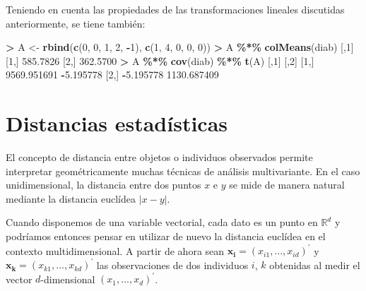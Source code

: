 \documentclass[
  a4paper,
  oneside]{scrbook}
\newenvironment{Shaded}{\begin{snugshade}}{\end{snugshade}}
\newcommand{\DecValTok}[1]{\textcolor[rgb]{0.00,0.00,0.81}{#1}}
\newcommand{\FloatTok}[1]{\textcolor[rgb]{0.00,0.00,0.81}{#1}}
\newcommand{\FunctionTok}[1]{\textcolor[rgb]{0.13,0.29,0.53}{\textbf{#1}}}
\newcommand{\NormalTok}[1]{#1}
\newcommand{\OtherTok}[1]{\textcolor[rgb]{0.56,0.35,0.01}{#1}}
\newcommand{\SpecialCharTok}[1]{\textcolor[rgb]{0.81,0.36,0.00}{\textbf{#1}}}
\theoremstyle{definition}
\theoremstyle{definition}
\theoremstyle{definition}
\theoremstyle{definition}
\theoremstyle{remark}
\begin{document}
Teniendo en cuenta las propiedades de las transformaciones lineales
discutidas anteriormente, se tiene también:

\footnotesize

\begin{Shaded}
\begin{Highlighting}[]
\SpecialCharTok{\textgreater{}}\NormalTok{ A }\OtherTok{\textless{}{-}} \FunctionTok{rbind}\NormalTok{(}\FunctionTok{c}\NormalTok{(}\DecValTok{0}\NormalTok{, }\DecValTok{0}\NormalTok{, }\DecValTok{1}\NormalTok{, }\DecValTok{2}\NormalTok{, }\SpecialCharTok{{-}}\DecValTok{1}\NormalTok{), }\FunctionTok{c}\NormalTok{(}\DecValTok{1}\NormalTok{, }\DecValTok{4}\NormalTok{, }\DecValTok{0}\NormalTok{, }\DecValTok{0}\NormalTok{, }\DecValTok{0}\NormalTok{))}
\SpecialCharTok{\textgreater{}}\NormalTok{ A }\SpecialCharTok{\%*\%} \FunctionTok{colMeans}\NormalTok{(diab)}
\NormalTok{         [,}\DecValTok{1}\NormalTok{]}
\NormalTok{[}\DecValTok{1}\NormalTok{,] }\FloatTok{585.7826}
\NormalTok{[}\DecValTok{2}\NormalTok{,] }\FloatTok{362.5700}
\SpecialCharTok{\textgreater{}}\NormalTok{ A }\SpecialCharTok{\%*\%} \FunctionTok{cov}\NormalTok{(diab) }\SpecialCharTok{\%*\%} \FunctionTok{t}\NormalTok{(A)}
\NormalTok{            [,}\DecValTok{1}\NormalTok{]        [,}\DecValTok{2}\NormalTok{]}
\NormalTok{[}\DecValTok{1}\NormalTok{,] }\FloatTok{9569.951691}   \SpecialCharTok{{-}}\FloatTok{5.195778}
\NormalTok{[}\DecValTok{2}\NormalTok{,]   }\SpecialCharTok{{-}}\FloatTok{5.195778} \FloatTok{1130.687409}
\end{Highlighting}
\end{Shaded}

\normalsize

\section{Distancias estadísticas}\label{distancias-estadisticas}

El concepto de distancia entre objetos o individuos observados permite
interpretar geométricamente muchas técnicas de análisis multivariante.
En el caso unidimensional, la distancia entre dos puntos \(x\) e \(y\) se
mide de manera natural mediante la distancia euclídea
\(\left|x-y\right|\).

Cuando disponemos de una variable vectorial, cada dato es un punto en
\(\mathbb{R}^d\) y podríamos entonces pensar en utilizar de nuevo la
distancia euclídea en el contexto multidimensional. A partir de ahora
sean \(\bm{x_i}=(x_{i1},\ldots,x_{id})^\prime{}\) y
\(\bm{x_k}=(x_{k1},\ldots,x_{kd})^\prime{}\) las observaciones de dos
individuos \(i\), \(k\) obtenidas al medir el vector \(d\)-dimensional
\((x_1,\ldots, x_d)^\prime{}\).
\end{document}

